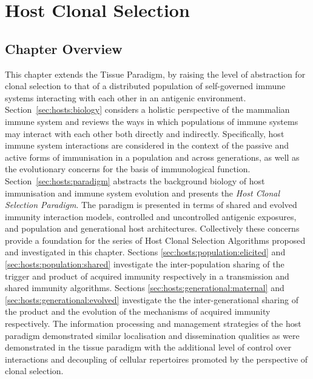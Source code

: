 %
%
\chapter{Host Clonal Selection}
\label{chap:hosts}

%
%
\section{Chapter Overview}
\label{sec:hosts:overview}
This chapter extends the Tissue Paradigm, by raising the level of abstraction for clonal selection to that of a distributed population of self-governed immune systems interacting with each other in an antigenic environment. 
Section~\ref{sec:hosts:biology} considers a holistic perspective of the mammalian immune system and reviews the ways in which populations of immune systems may interact with each other both directly and indirectly. Specifically, host immune system interactions are considered in the context of the passive and active forms of immunisation in a population and across generations, as well as the evolutionary concerns for the basis of immunological function.
Section~\ref{sec:hosts:paradigm} abstracts the background biology of host immunisation and immune system evolution and presents the \emph{Host Clonal Selection Paradigm}. The paradigm is presented in terms of shared and evolved immunity interaction models, controlled and uncontrolled antigenic exposures, and population and generational host architectures. Collectively these concerns provide a foundation for the series of Host Clonal Selection Algorithms proposed and investigated in this chapter.
Sections \ref{sec:hosts:population:elicited} and \ref{sec:hosts:population:shared} investigate the inter-population sharing of the trigger and product of acquired immunity respectively in a transmission and shared immunity algorithms. 
Sections \ref{sec:hosts:generational:maternal} and \ref{sec:hosts:generational:evolved} investigate the the inter-generational sharing of the product and the evolution of the mechanisms of acquired immunity respectively. 
The information processing and management strategies of the host paradigm demonstrated similar localisation and dissemination qualities as were demonstrated in the tissue paradigm with the additional level of control over interactions and decoupling of cellular repertoires promoted by the perspective of clonal selection.

